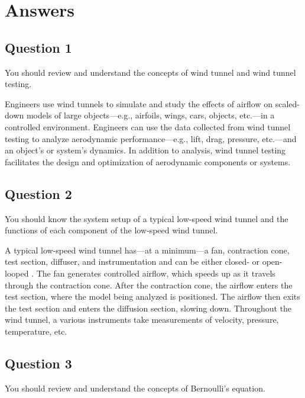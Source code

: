 \chapter{Answers}
\label{cp:answers}
\section{Question 1}
\begin{importantbox}
    You should review and understand the concepts of wind tunnel and wind tunnel testing.
\end{importantbox}

Engineers use wind tunnels to simulate and study the effects of airflow on scaled-down models of large objects—e.g., airfoils, wings, cars, objects, etc.—in a controlled environment. Engineers can use the data collected from wind tunnel testing to analyze aerodynamic performance—e.g., lift, drag, pressure, etc.—and an object's or system's dynamics. In addition to analysis, wind tunnel testing facilitates the design and optimization of aerodynamic components or systems.

\section{Question 2}
\begin{importantbox}
    You should know the system setup of a typical low-speed wind tunnel and the functions of each component of the low‐speed wind tunnel.
\end{importantbox}

A typical low-speed wind tunnel has—at a minimum—a fan, contraction cone, test section, diffuser, and instrumentation and can be either closed- or open-looped \citep{Hall_2021a, Hall_2021b}. The fan generates controlled airflow, which speeds up as it travels through the contraction cone. After the contraction cone, the airflow enters the test section, where the model being analyzed is positioned. The airflow then exits the test section and enters the diffusion section, slowing down. Throughout the wind tunnel, a various instruments take measurements of velocity, pressure, temperature, etc.

\section{Question 3}
\begin{importantbox}
    You should review and understand the concepts of Bernoulli’s equation.
\end{importantbox}

